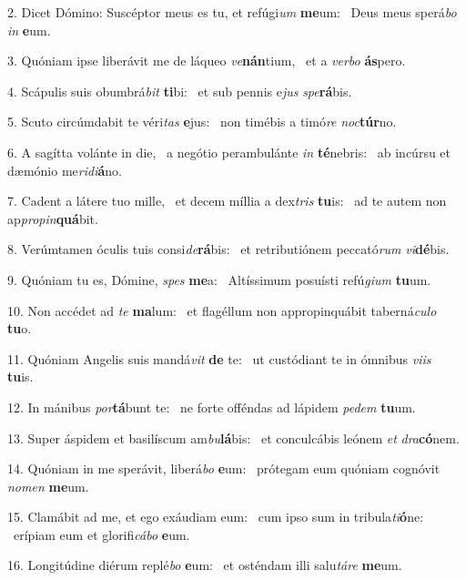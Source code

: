2. Dicet Dómino: Suscéptor meus es tu, et refúgi\textit{um} \textbf{me}um: \ast\  Deus meus sperá\textit{bo} \textit{in} \textbf{e}um.\

3. Quóniam ipse liberávit me de láqueo \textit{ve}\textbf{nán}tium, \ast\  et a \textit{ver}\textit{bo} \textbf{ás}pero.\

4. Scápulis suis obumbrá\textit{bit} \textbf{ti}bi: \ast\  et sub pennis e\textit{jus} \textit{spe}\textbf{rá}bis.\

5. Scuto circúmdabit te véri\textit{tas} \textbf{e}jus: \ast\  non timébis a timó\textit{re} \textit{noc}\textbf{túr}no.\

6. A sagítta volánte in die, \dag\  a negótio perambulánte \textit{in} \textbf{té}nebris: \ast\  ab incúrsu et dæmónio me\textit{ri}\textit{di}\textbf{á}no.\

7. Cadent a látere tuo mille, \dag\  et decem míllia a dex\textit{tris} \textbf{tu}is: \ast\  ad te autem non ap\textit{pro}\textit{pin}\textbf{quá}bit.\

8. Verúmtamen óculis tuis consi\textit{de}\textbf{rá}bis: \ast\  et retributiónem peccató\textit{rum} \textit{vi}\textbf{dé}bis.\

9. Quóniam tu es, Dómine, \textit{spes} \textbf{me}a: \ast\  Altíssimum posuísti refú\textit{gi}\textit{um} \textbf{tu}um.\

10. Non accédet ad \textit{te} \textbf{ma}lum: \ast\  et flagéllum non appropinquábit taberná\textit{cu}\textit{lo} \textbf{tu}o.\

11. Quóniam Angelis suis mandá\textit{vit} \textbf{de} te: \ast\  ut custódiant te in ómnibus \textit{vi}\textit{is} \textbf{tu}is.\

12. In mánibus \textit{por}\textbf{tá}bunt te: \ast\  ne forte offéndas ad lápidem \textit{pe}\textit{dem} \textbf{tu}um.\

13. Super áspidem et basilíscum am\textit{bu}\textbf{lá}bis: \ast\  et conculcábis leónem \textit{et} \textit{dra}\textbf{có}nem.\

14. Quóniam in me sperávit, liberá\textit{bo} \textbf{e}um: \ast\  prótegam eum quóniam cognóvit \textit{no}\textit{men} \textbf{me}um.\

15. Clamábit ad me, et ego exáudiam eum: \dag\  cum ipso sum in tribula\textit{ti}\textbf{ó}ne: \ast\  erípiam eum et glorifi\textit{cá}\textit{bo} \textbf{e}um.\

16. Longitúdine diérum replé\textit{bo} \textbf{e}um: \ast\  et osténdam illi salu\textit{tá}\textit{re} \textbf{me}um.\

